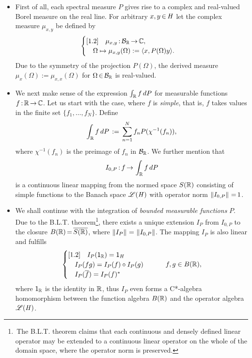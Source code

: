 \documentclass[11pt,twoside]{article}
\begin{document}
\begin{itemize}[leftmargin=12pt,itemsep=2mm]
\item[1.]
First of all,
each spectral measure $P$ gives rise
to a complex and real-valued Borel measure on the real line.
For arbitrary $x,y {\,\in\,} \mathit{H}$
let the complex measure $\mu_{x,y}$ be defined by
\[
\begin{cases}[1.2]
\quad \mu_{x,y}{\,:\,} {\mathcal{B}}_{{\mathbb{R}}} {\,\to\,} {\mathbb{C}},\\
\quad \Omega \mapsto \mu_{x,y}(\Omega) := \langle x,P(\Omega)y \rangle.\\
\end{cases}
\]
Due to the symmetry of the projection $P(\Omega)$,
the derived measure
$\mu_x(\Omega) := \mu_{x,x}(\Omega)$
for $\Omega {\,\in\,} {\mathcal{B}}_{{\mathbb{R}}}$ is real-valued.

\item[2.]
We next make sense of the expression $\int_{{\mathbb{R}}} f \, dP$
for measurable functions $f{\,:\,}{\mathbb{R}} {\,\to\,} {\mathbb{C}}$.
Let us start with the case, where $f$ is \textit{simple},
that is,
$f$ takes values in the finite set $\{f_1,\ldots,f_N\}$.
Define
\[
\int_{{\mathbb{R}}} f \, d{P} \,:=\, \sum_{n=1}^N f_n {P}(\chi^{-1}(f_n)),
\]
where $\chi^{-1}(f_n)$ is the preimage of $f_n$ in ${\mathcal{B}}_{{\mathbb{R}}}$.
We further mention
that
\[
I_{0,{P}}{\,:\,}f {\,\to\,} \int_{{\mathbb{R}}} f \, d{P}
\]
is a continuous linear mapping from the normed space
$S({\mathbb{R}})$ consisting of simple functions
to the Banach space $\mathscr{L}(\mathit{H})$ with operator norm $\left\lVert I_{0,P} \right\rVert {\,=\,} 1$.

\item[3.]
We shall continue with the integration
of \textit{bounded measurable functions} {\wrt} $P$.
Due to the B.L.T. theorem\footnote{
\,The B.L.T. theorem claims that each continuous and densely defined linear operator
may be extended to a continuous linear operator on the whole of the domain space,
where the operator norm is preserved.},
there exists a unique extension $I_P$ from $I_{0,P}$
to the closure $B({\mathbb{R}}) {\,=\,} \overline{S({\mathbb{R}})}$,
where $\left\lVert I_P \right\rVert {\,=\,} \left\lVert I_{0,P} \right\rVert$.
The mapping $I_P$ is also linear and fulfills
\[
\begin{cases}[1.2]
\quad I_P({\mathsf{1}}_{{\mathbb{R}}}) = {\mathsf{1}}_{\mathit{H}}\\
\quad I_P(fg) = I_P(f) \circ I_P(g)\\
\quad I_P(\overline{f}) = I_P(f)^*\\
\end{cases}
\quad \quad f,g \in B({\mathbb{R}}),
\]
where ${\mathsf{1}}_{{\mathbb{R}}}$ is the identity in ${\mathbb{R}}$,
thus $I_P$ even forms a C*-algebra homomorphism between
the function algebra $B({\mathbb{R}})$ and the operator algebra $\mathscr{L}(\mathit{H})$.


\end{itemize}
\end{document}
